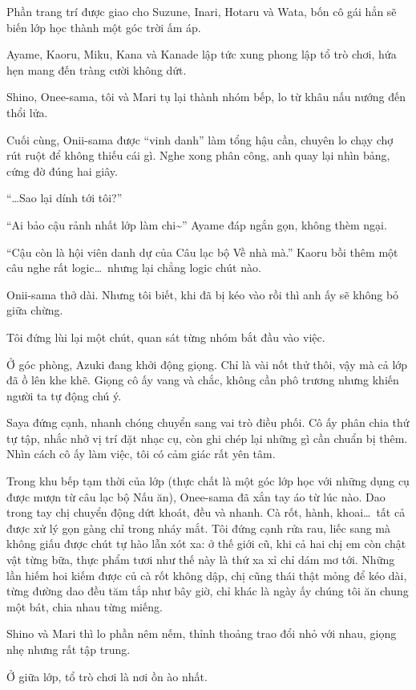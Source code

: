 \documentclass[../main.tex]{subfiles}
\begin{document}
Phần trang trí được giao cho Suzune, Inari, Hotaru và Wata, bốn cô gái hẳn sẽ biến lớp học thành một góc trời ấm áp.

Ayame, Kaoru, Miku, Kana và Kanade lập tức xung phong lập tổ trò chơi, hứa hẹn mang đến tràng cười không dứt.

Shino, Onee-sama, tôi và Mari tụ lại thành nhóm bếp, lo từ khâu nấu nướng đến thổi lửa.

Cuối cùng, Onii-sama được ``vinh danh'' làm tổng hậu cần, chuyên lo chạy chợ rút ruột để không thiếu cái gì. Nghe xong phân công, anh quay lại nhìn bảng, cứng đờ đúng hai giây.

``\dots Sao lại dính tới tôi?''

``Ai bảo cậu rảnh nhất lớp làm chi\~{}'' Ayame đáp ngắn gọn, không thèm ngại.

``Cậu còn là hội viên danh dự của Câu lạc bộ Về nhà mà.'' Kaoru bồi thêm một câu nghe rất logic\dots\ nhưng lại chẳng logic chút nào.

Onii-sama thở dài. Nhưng tôi biết, khi đã bị kéo vào rồi thì anh ấy sẽ không bỏ giữa chừng.

Tôi đứng lùi lại một chút, quan sát từng nhóm bắt đầu vào việc.

Ở góc phòng, Azuki đang khởi động giọng. Chỉ là vài nốt thử thôi, vậy mà cả lớp đã ồ lên khe khẽ. Giọng cô ấy vang và chắc, không cần phô trương nhưng khiến người ta tự động chú ý.

Saya đứng cạnh, nhanh chóng chuyển sang vai trò điều phối. Cô ấy phân chia thứ tự tập, nhắc nhở vị trí đặt nhạc cụ, còn ghi chép lại những gì cần chuẩn bị thêm. Nhìn cách cô ấy làm việc, tôi có cảm giác rất yên tâm.

Trong khu bếp tạm thời của lớp (thực chất là một góc lớp học với những dụng cụ được mượn từ câu lạc bộ Nấu ăn), Onee-sama đã xắn tay áo từ lúc nào. Dao trong tay chị chuyển động dứt khoát, đều và nhanh. Cà rốt, hành, khoai\dots\ tất cả được xử lý gọn gàng chỉ trong nháy mắt. Tôi đứng cạnh rửa rau, liếc sang mà không giấu được chút tự hào lẫn xót xa: ở thế giới cũ, khi cả hai chị em còn chật vật từng bữa, thực phẩm tươi như thế này là thứ xa xỉ chỉ dám mơ tới. Những lần hiếm hoi kiếm được củ cà rốt không dập, chị cũng thái thật mỏng để kéo dài, từng đường dao đều tăm tắp như bây giờ, chỉ khác là ngày ấy chúng tôi ăn chung một bát, chia nhau từng miếng.

Shino và Mari thì lo phần nêm nếm, thỉnh thoảng trao đổi nhỏ với nhau, giọng nhẹ nhưng rất tập trung.

Ở giữa lớp, tổ trò chơi là nơi ồn ào nhất.
\end{document}
